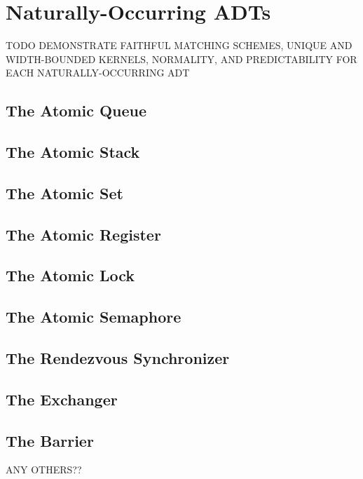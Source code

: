 \section{Naturally-Occurring ADTs}
\label{sec:nature}

TODO DEMONSTRATE FAITHFUL MATCHING SCHEMES, UNIQUE AND WIDTH-BOUNDED KERNELS,
NORMALITY, AND PREDICTABILITY FOR EACH NATURALLY-OCCURRING ADT

\subsection{The Atomic Queue}

\subsection{The Atomic Stack}

\subsection{The Atomic Set}

\subsection{The Atomic Register}

\subsection{The Atomic Lock}

\subsection{The Atomic Semaphore}

\subsection{The Rendezvous Synchronizer}

\subsection{The Exchanger}

\subsection{The Barrier}

ANY OTHERS??
